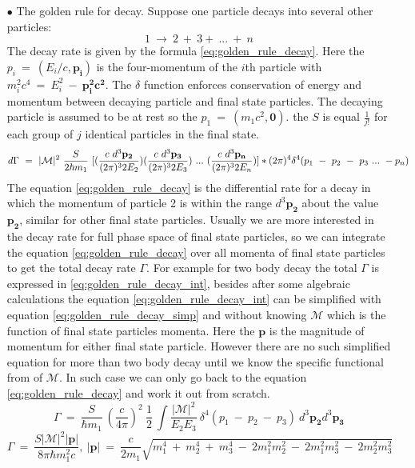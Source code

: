 \begin{itemize}
\item[$\bullet$] The golden rule for decay.
 Suppose one particle decays into several other particles:
 \begin{equation}
 1~\rightarrow~2~+~3+~...~+~n
 \label{eq:one_decay}
\end{equation}
 The decay rate is given by the formula \ref{eq:golden_rule_decay}. Here the $p_{i}~=~(E_{i}/c,\mathbf{p_{i}})$ is the four-momentum of the $i$th particle with $m_{i}^{2}c^{4}~=~E_{i}^{2}~-~\mathbf{p_{i}^{2}c^{2}}$. The $\delta$ function enforces conservation of energy and momentum between decaying particle and final state particles. The decaying particle is assumed to be at rest so the $p_{1}~=~(m_{1}c^{2},\mathbf{0})$. the $S$ is equal $\frac{1}{j!}$ for each group of $j$ identical particles in the final state.
\begin{equation}
d\Gamma~=~|\mathcal{M}|^{2}~\frac{S}{2\hbar m_{1}}~[(\frac{c~d^{3}\mathbf{p_{2}}}{(2\pi)^{3}2E_{2}})(\frac{c~d^{3}\mathbf{p_{3}}}{(2\pi)^{3}2E_{3}})~...~(\frac{c~d^{3}\mathbf{p_{n}}}{(2\pi)^{3}2E_{n}})]\\
*(2\pi)^{4}\delta^{4}(p_{1}~-~p_{2}~-~p_{3}~...~-p_{n})
\label{eq:golden_rule_decay}
\end{equation}
The equation \ref{eq:golden_rule_decay} is the differential rate for a decay in which the momentum of particle 2 is within the range $d^{3}\mathbf{p_{2}}$ about the value $\mathbf{p_{2}}$, similar for other final state particles. Usually we are more interested in the decay rate for full phase space of final state particles, so we can integrate the equation \ref{eq:golden_rule_decay} over all momenta of final state particles to get the total decay rate $\Gamma$. For example for two body decay the total $\Gamma$ is expressed in \ref{eq:golden_rule_decay_int}, besides after some algebraic calculations the equation \ref{eq:golden_rule_decay_int} can be simplified with equation \ref{eq:golden_rule_decay_simp} and without knowing $\mathcal{M}$ which is the function of final state particles momenta. Here the $\mathbf{p}$ is the magnitude of momentum for either final state particle. However there are no such simplified equation for more than two body decay until we know the specific functional from of $\mathcal{M}$. In such case we can only go back to the equation \ref{eq:golden_rule_decay} and work it out from scratch.
\begin{equation}
\Gamma~=~\frac{S}{\hbar m_{1}}~(\frac{c}{4\pi})^{2}~\frac{1}{2}~\int\frac{|\mathcal{M}|^{2}}{E_{2}E_{3}}~\delta^{4}(p_{1}~-~p_{2}~-~p_{3})~d^{3}\mathbf{p_{2}}d^{3}\mathbf{p_{3}}
\label{eq:golden_rule_decay_int}
\end{equation}
\begin{equation}
\Gamma~=~\frac{S|\mathcal{M}|^{2}|\mathbf{p}|}{8\pi\hbar m_{1}^{2}c},~|\mathbf{p}|~=~\frac{c}{2m_{1}}\sqrt{m_{1}^{4}~+~m_{2}^{4}~+~m_{3}^{4}~-~2m_{1}^{2}m_{2}^{2}~-~2m_{1}^{2}m_{3}^{2}~-~2m_{2}^{2}m_{3}^{2}}
\label{eq:golden_rule_decay_simp}
\end{equation}


\end{itemize}
